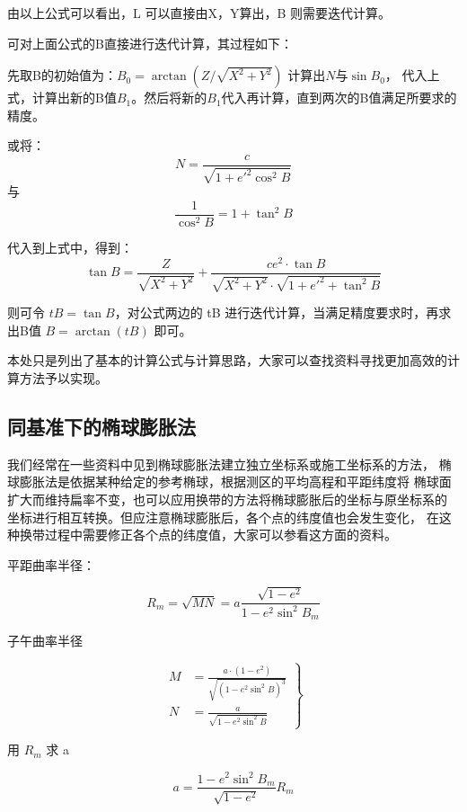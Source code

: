 由以上公式可以看出，L 可以直接由X，Y算出，B 则需要迭代计算。

可对上面公式的B直接进行迭代计算，其过程如下：


先取B的初始值为：$B_0 =\arctan{ (Z / \sqrt{X^2 + Y^2} ) }$ 计算出$N$与$\sin B_0$，
代入上式，计算出新的B值$B_1$。然后将新的$B_1$代入再计算，直到两次的B值满足所要求的
精度。

或将：
$$N = \frac{c}{\sqrt{1+e'^2 \cos ^2 B}}$$
与$$\frac{1}{\cos^2 B} = 1+ \tan^2 B$$

代入到上式中，得到：
\begin{equation}
    \tan B = \frac{Z}{\sqrt{X^2 + Y^2}} + \frac{ce^2 \cdot \tan B}{\sqrt{X^2 + Y^2} \cdot \sqrt{1 + e'^2 + \tan^2 B}}
\end{equation}

则可令 $tB = \tan B$，对公式两边的 tB 进行迭代计算，当满足精度要求时，再求出B值 $B = \arctan (tB)$ 即可。 %

本处只是列出了基本的计算公式与计算思路，大家可以查找资料寻找更加高效的计算方法予以实现。

\subsection{同基准下的椭球膨胀法}

我们经常在一些资料中见到椭球膨胀法建立独立坐标系或施工坐标系的方法，
椭球膨胀法是依据某种给定的参考椭球，根据测区的平均高程和平距纬度将
椭球面扩大而维持扁率不变，也可以应用换带的方法将椭球膨胀后的坐标与原坐标系的
坐标进行相互转换。但应注意椭球膨胀后，各个点的纬度值也会发生变化，
在这种换带过程中需要修正各个点的纬度值，大家可以参看这方面的资料。


平距曲率半径：

$$R_m = \sqrt{MN}= a \frac{\sqrt{1-e^2}}{1-e^2 \sin^2 B_m}$$


子午曲率半径

$$
    \left .
    \begin{aligned}
        M & = \frac{a \cdot (1-e^2)}{\sqrt{(1-e^2 \sin ^2 B)^3}} \\
        N & = \frac{a}{\sqrt{1-e^2 \sin^2 B}}
    \end{aligned}
    \right \}
$$


用 $R_m$ 求 a

$$a = \frac{1-e^2 \sin^2 B_m }{\sqrt{1-e^2}} R_m$$


